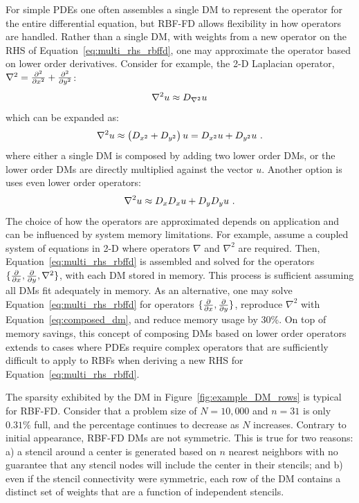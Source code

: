 \documentclass[11pt]{report}
\begin{document}
{For simple PDEs one often assembles a single DM to represent the operator for the entire differential equation, but RBF-FD allows flexibility in how operators are handled. Rather than a single DM, with weights from a new operator on the RHS of Equation~\ref{eq:multi_rhs_rbffd}, one may approximate the operator based on lower order derivatives. Consider for example, the 2-D Laplacian operator, $\nabla^2 = \frac{\partial^2 }{\partial x^2} + \frac{\partial^2 }{\partial y^2} $: 
\begin{align*}
\nabla^2 u \approx D_{\nabla^2 } u
\end{align*}
which can be expanded as: 
\begin{align*}
\nabla^2 u \approx \left(D_{x^2} + D_{y^2}\right) u = D_{x^2} u + D_{y^2} u \ .
\end{align*}
where either a single DM is composed by adding two lower order DMs, or the lower order DMs are directly multiplied against the vector $u$. Another option is uses even lower order operators:
\begin{align}
\nabla^2 u \approx D_{x} D_{x} u + D_{y} D_{y} u \label{eq:composed_dm}\ .
\end{align}
The choice of how the operators are approximated depends on application and can be influenced by system memory limitations. For example, assume a coupled system of equations in 2-D where operators $\nabla$ and $\nabla^2$ are required. Then, Equation~\ref{eq:multi_rhs_rbffd} is assembled and solved for the operators $\{\frac{\partial }{\partial x}, \frac{\partial }{\partial y}, \nabla^2\}$, with each DM stored in memory. This process is sufficient assuming all DMs fit adequately in memory. As an alternative, one may solve Equation~\ref{eq:multi_rhs_rbffd} for operators $\{\frac{\partial }{\partial x}, \frac{\partial }{\partial y}\}$, reproduce $\nabla^2$ with Equation~\ref{eq:composed_dm}, and reduce memory usage by 30\%. 
On top of memory savings, this concept of composing DMs based on lower order operators extends to cases where PDEs require complex operators that are sufficiently difficult to apply to RBFs when deriving a new RHS for Equation~\ref{eq:multi_rhs_rbffd}.  
 

The sparsity exhibited by the DM in Figure~\ref{fig:example_DM_rows} is typical for RBF-FD. Consider that a problem size of $N=10,000$ and $n=31$ is only $0.31\%$ full, and the percentage continues to decrease as $N$ increases. Contrary to initial appearance, RBF-FD DMs are not symmetric. This is true for two reasons: a) a stencil around a center is generated based on $n$ nearest neighbors with no guarantee that any stencil nodes will include the center in their stencils; and  b) even if the stencil connectivity were symmetric, each row of the DM contains a distinct set of weights that are a function of independent stencils.

}
\end{document}
